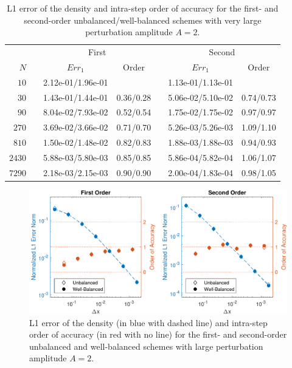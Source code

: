 \begin{table}\centering
\caption{L1 error of the density and intra-step order of accuracy for the first- and second-order unbalanced/well-balanced schemes with very large perturbation amplitude $A=2$.}
\label{table:OVS_Alarge}
\begin{tabular}{@{}rcccccc@{}}\toprule
& \phantom{a} & \multicolumn{2}{c}{First} & \phantom{ab} & \multicolumn{2}{c}{Second}\\
\cmidrule{3-4} \cmidrule{6-7}
$N$ && $Err_1$ & Order && $Err_1$ & Order\\ \midrule
$10$ && 2.12e-01/1.96e-01 &&& 1.13e-01/1.13e-01 &\\
$30$ && 1.43e-01/1.44e-01 & 0.36/0.28 && 5.06e-02/5.10e-02 & 0.74/0.73\\
$90$ && 8.04e-02/7.93e-02 & 0.52/0.54 && 1.75e-02/1.75e-02 & 0.97/0.97\\
$270$ && 3.69e-02/3.66e-02 & 0.71/0.70 && 5.26e-03/5.26e-03 & 1.09/1.10\\
$810$ && 1.50e-02/1.48e-02 & 0.82/0.83 && 1.88e-03/1.88e-03 & 0.94/0.93\\
$2430$ && 5.88e-03/5.80e-03 & 0.85/0.85 && 5.86e-04/5.82e-04 & 1.06/1.07\\
$7290$ && 2.18e-03/2.15e-03 & 0.90/0.90 && 2.00e-04/1.83e-04 & 0.98/1.05\\
\bottomrule
\end{tabular}
\end{table}

\begin {figure}
\centering
\includegraphics[width=13cm]{figures/OVSeps2}
\caption {L1 error of the density (in blue with dashed line) and intra-step order of accuracy (in red with no line) for the first- and second-order unbalanced and well-balanced schemes with large perturbation amplitude $A=2$.}
\label{fig:OVS_Alarge}
\end{figure}


